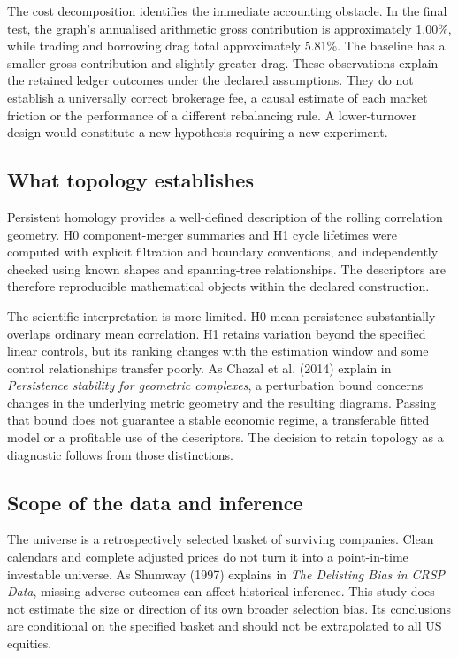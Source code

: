 \documentclass[12pt,a4paper,oneside]{article}
\begin{document}
The cost decomposition identifies the immediate accounting obstacle. In the final test, the graph's annualised arithmetic gross contribution is approximately 1.00\%, while trading and borrowing drag total approximately 5.81\%. The baseline has a smaller gross contribution and slightly greater drag. These observations explain the retained ledger outcomes under the declared assumptions. They do not establish a universally correct brokerage fee, a causal estimate of each market friction or the performance of a different rebalancing rule. A lower-turnover design would constitute a new hypothesis requiring a new experiment.


\subsection{What topology establishes}

Persistent homology provides a well-defined description of the rolling correlation geometry. H0 component-merger summaries and H1 cycle lifetimes were computed with explicit filtration and boundary conventions, and independently checked using known shapes and spanning-tree relationships. The descriptors are therefore reproducible mathematical objects within the declared construction.


The scientific interpretation is more limited. H0 mean persistence substantially overlaps ordinary mean correlation. H1 retains variation beyond the specified linear controls, but its ranking changes with the estimation window and some control relationships transfer poorly. As Chazal et al. (2014) explain in \textit{Persistence stability for geometric complexes}, a perturbation bound concerns changes in the underlying metric geometry and the resulting diagrams. Passing that bound does not guarantee a stable economic regime, a transferable fitted model or a profitable use of the descriptors. The decision to retain topology as a diagnostic follows from those distinctions.


\subsection{Scope of the data and inference}

The universe is a retrospectively selected basket of surviving companies. Clean calendars and complete adjusted prices do not turn it into a point-in-time investable universe. As Shumway (1997) explains in \textit{The Delisting Bias in CRSP Data}, missing adverse outcomes can affect historical inference. This study does not estimate the size or direction of its own broader selection bias. Its conclusions are conditional on the specified basket and should not be extrapolated to all US equities.
\end{document}
